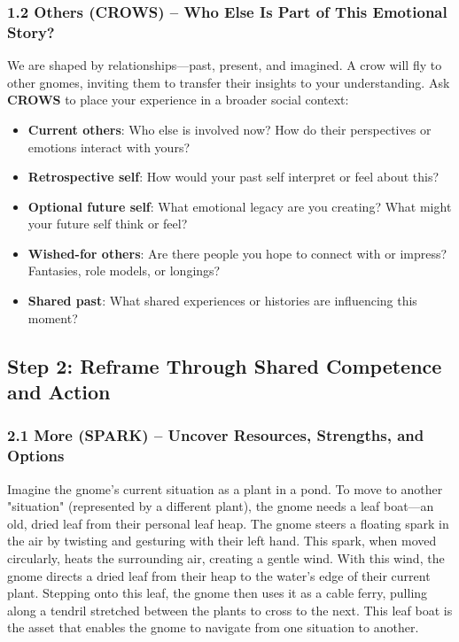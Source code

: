 \documentclass{article}
\begin{document}
\subsubsection{1.2 Others (CROWS) – Who Else Is Part of This Emotional Story?}
We are shaped by relationships—past, present, and imagined. A crow will fly to other gnomes, inviting them to transfer their insights to your understanding. Ask \textbf{CROWS} to place your experience in a broader social context:
\begin{itemize}[noitemsep,topsep=0pt]
    \item \textbf{Current others}: Who else is involved now? How do their perspectives or emotions interact with yours?
    \item \textbf{Retrospective self}: How would your past self interpret or feel about this?
    \item \textbf{Optional future self}: What emotional legacy are you creating? What might your future self think or feel?
    \item \textbf{Wished-for others}: Are there people you hope to connect with or impress? Fantasies, role models, or longings?
    \item \textbf{Shared past}: What shared experiences or histories are influencing this moment?
\end{itemize}

\subsection{Step 2: Reframe Through Shared Competence and Action}

\subsubsection{2.1 More (SPARK) – Uncover Resources, Strengths, and Options}
Imagine the gnome's current situation as a plant in a pond. To move to another "situation" (represented by a different plant), the gnome needs a leaf boat—an old, dried leaf from their personal leaf heap. The gnome steers a floating spark in the air by twisting and gesturing with their left hand. This spark, when moved circularly, heats the surrounding air, creating a gentle wind. With this wind, the gnome directs a dried leaf from their heap to the water’s edge of their current plant. Stepping onto this leaf, the gnome then uses it as a cable ferry, pulling along a tendril stretched between the plants to cross to the next. This leaf boat is the asset that enables the gnome to navigate from one situation to another.
\end{document}
